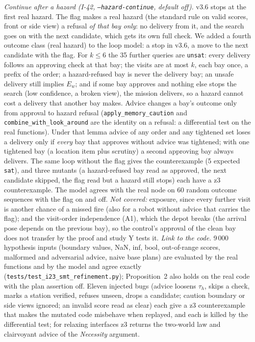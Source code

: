 \emph{Continue after a hazard (I-42, \texttt{--hazard-continue}, default off).} v3.6 stops at the first real hazard. The flag makes a real hazard (the standard rule on valid scores, front or side view) a refusal \emph{of that bay only}: no delivery from it, and the search goes on with the next candidate, which gets its own full check. We added a fourth outcome class (real hazard) to the loop model: a stop in v3.6, a move to the next candidate with the flag. For $k\le6$ the 35 further queries are \texttt{unsat}: every delivery follows an approving check at that bay; the visits are at most $k$, each bay once, a prefix of the order; a hazard-refused bay is never the delivery bay; an unsafe delivery still implies $E_w$; and if some bay approves and nothing else stops the search (low confidence, a broken view), the mission delivers, so a hazard cannot cost a delivery that another bay makes. Advice changes a bay's outcome only from approval to hazard refusal (\texttt{apply\_memory\_caution} and \texttt{combine\_with\_look\_around} are the identity on a refusal: a differential test on the real functions). Under that lemma advice of any order and any tightened set loses a delivery only if \emph{every} bay that approves without advice was tightened; with one tightened bay (a location item plus scrutiny) a second approving bay always delivers. The same loop without the flag gives the counterexample (5 expected \texttt{sat}), and three mutants (a hazard-refused bay read as approved, the next candidate skipped, the flag read but a hazard still stops) each have a z3 counterexample. The model agrees with the real node on 60 random outcome sequences with the flag on and off. \emph{Not covered:} exposure, since every further visit is another chance of a missed fire (also for a robot without advice that carries the flag); and the visit-order independence (A1), which the depot breaks (the arrival pose depends on the previous bay), so the control's approval of the clean bay does not transfer by the proof and study Y tests it.
\emph{Link to the code.} 9\,000 hypothesis inputs (boundary values, NaN, inf, bool, out-of-range scores, malformed and adversarial advice, naive base plans) are evaluated by the real functions and by the model and agree exactly (\texttt{tests/test\_i23\_smt\_refinement.py}); Proposition~2 also holds on the real code with the plan assertion off. Eleven injected bugs (advice loosens $\tau_h$, skips a check, marks a station verified, refuses unseen, drops a candidate; caution boundary or side views ignored; an invalid score read as clear) each give a z3 counterexample that makes the mutated code misbehave when replayed, and each is killed by the differential test; for relaxing interfaces z3 returns the two-world law and clairvoyant advice of the \emph{Necessity} argument.
